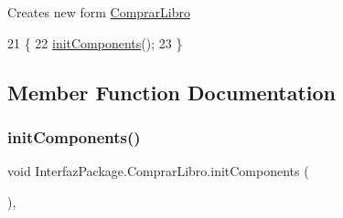 Creates new form \mbox{\hyperlink{class_interfaz_package_1_1_comprar_libro}{Comprar\+Libro}} 
\begin{DoxyCode}
21                           \{
22         \mbox{\hyperlink{class_interfaz_package_1_1_comprar_libro_af7b7832e99e461847ab13c76f089b9ff}{initComponents}}();
23     \}
\end{DoxyCode}


\subsection{Member Function Documentation}
\mbox{\label{class_interfaz_package_1_1_comprar_libro_af7b7832e99e461847ab13c76f089b9ff}} 
\subsubsection{\texorpdfstring{init\+Components()}{initComponents()}}
{\footnotesize\ttfamily void Interfaz\+Package.\+Comprar\+Libro.\+init\+Components (\begin{DoxyParamCaption}{ }\end{DoxyParamCaption})\hspace{0.3cm}{\ttfamily [inline]}, {\ttfamily [private]}}

